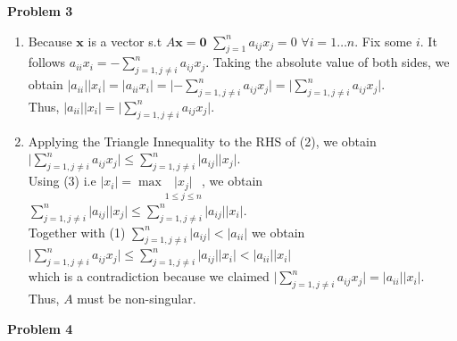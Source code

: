 \documentclass[10pt]{article}
\begin{document}
\textbf{Problem 3}\begin{enumerate}[label=(\alph*)]
    \item Because $\mathbf{x}$ is a vector s.t $A\mathbf{x}=\mathbf{0}$ $\displaystyle \sum_{j=1}^{n}a_{ij}x_j=0$ $\forall i=1\ldots n$.
    Fix some $i$. It follows $\displaystyle a_{ii}x_i=-\sum_{j=1,j\neq i}^{n}a_{ij}x_j$. 
    Taking the absolute value of both sides, we obtain $\displaystyle\lvert a_{ii}\rvert \lvert x_i\rvert=\lvert a_{ii}x_i\rvert=\lvert -\sum_{j=1,j\neq i}^{n}a_{ij}x_j\rvert=\lvert\sum_{j=1,j\neq i}^{n}a_{ij}x_j\rvert$.\\
    Thus, $\displaystyle\lvert a_{ii}\rvert \lvert x_i\rvert=\lvert\sum_{j=1,j\neq i}^{n}a_{ij}x_j\rvert$.
    \item Applying the Triangle Innequality to the RHS of (2), we obtain \\
    $\displaystyle\lvert\sum_{j=1,j\neq i}^{n}a_{ij}x_j\rvert\le\sum_{j=1,j\neq i}^{n}\lvert a_{ij}\rvert \lvert x_j\rvert$.\\
    Using (3) i.e $\lvert x_i\rvert =\max\underset{1\le j\le n}{\lvert x_j\rvert}$, we obtain\\
    $\displaystyle \sum_{j=1,j\neq i}^{n}\lvert a_{ij}\rvert \lvert x_j\rvert\le \sum_{j=1,j\neq i}^{n}\lvert a_{ij}\rvert \lvert x_i\rvert$.\\
    Together with (1) $\displaystyle \sum_{j=1,j\neq i}^{n}\lvert a_{ij}\rvert < \lvert a_{ii}\rvert$ we obtain\\
    $\displaystyle \lvert\sum_{j=1,j\neq i}^{n}a_{ij}x_j\rvert\le\sum_{j=1,j\neq i}^{n}\lvert a_{ij}\rvert \lvert x_i\rvert< \lvert a_{ii}\rvert\lvert x_i\rvert$\\
    which is a contradiction because we claimed $\displaystyle \lvert\sum_{j=1,j\neq i}^{n}a_{ij}x_j\rvert=\lvert a_{ii}\rvert\lvert x_i\rvert$.\\
    Thus, $A$ must be non-singular.
\end{enumerate}
\textbf{Problem 4}\\
\end{document}
